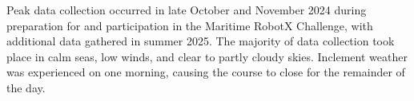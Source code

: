 \documentclass{erauthesis}
\begin{document}



Peak data collection occurred in late October and November 2024 during preparation for and participation in the Maritime RobotX Challenge, with additional data gathered in summer 2025.
The majority of data collection took place in calm seas, low winds, and clear to partly cloudy skies.
Inclement weather was experienced on one morning, causing the course to close for the remainder of the day. 

\end{document}
